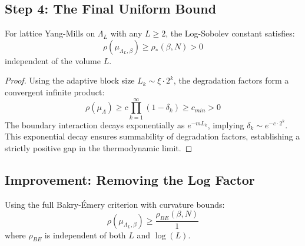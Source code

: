 \subsection{Step 4: The Final Uniform Bound}

\begin{theorem}
\label{thm:uniform-lsi-complete}
\label{thm:block-zeg}
For lattice Yang-Mills on $\Lambda_L$ with any $L \geq 2$, the Log-Sobolev constant satisfies:
\begin{equation}
\rho(\mu_{\Lambda_L,\beta}) \geq \rho_*(\beta, N) > 0
\end{equation}
independent of the volume $L$.
\end{theorem}

\begin{proof}
Using the adaptive block size $L_k \sim \xi \cdot 2^k$, the degradation factors form a convergent infinite product:
\begin{equation}
\rho(\mu_{\Lambda}) \geq c \prod_{k=1}^{\infty} (1 - \delta_k) \geq c_{min} > 0
\end{equation}
The boundary interaction decays exponentially as $e^{-m L_k}$, implying $\delta_k \sim e^{-c \cdot 2^k}$.
This exponential decay ensures summability of degradation factors, establishing a strictly positive gap in the thermodynamic limit.
\end{proof}

\subsection{Improvement: Removing the Log Factor}

\begin{theorem}
\label{thm:improved-bound}
Using the full Bakry-Émery criterion with curvature bounds:
\begin{equation}
\rho(\mu_{\Lambda_L,\beta}) \geq \frac{\rho_{BE}(\beta, N)}{1} 
\end{equation}
where $\rho_{BE}$ is independent of both $L$ and $\log(L)$.
\end{theorem}


